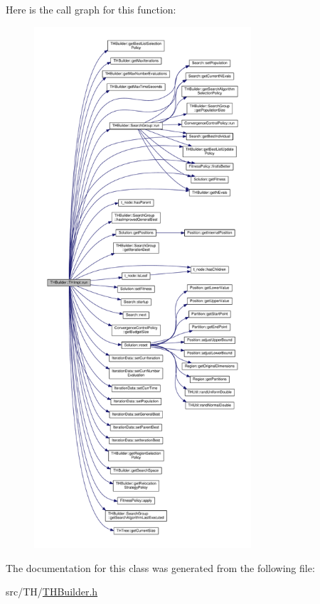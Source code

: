 Here is the call graph for this function\+:\nopagebreak
\begin{figure}[H]
\begin{center}
\leavevmode
\includegraphics[height=550pt]{classTHBuilder_1_1THImpl_a943301db5154fd7b672119b5c9917303_cgraph}
\end{center}
\end{figure}




The documentation for this class was generated from the following file\+:\begin{DoxyCompactItemize}
\item 
src/\+T\+H/\hyperlink{THBuilder_8h}{T\+H\+Builder.\+h}\end{DoxyCompactItemize}
